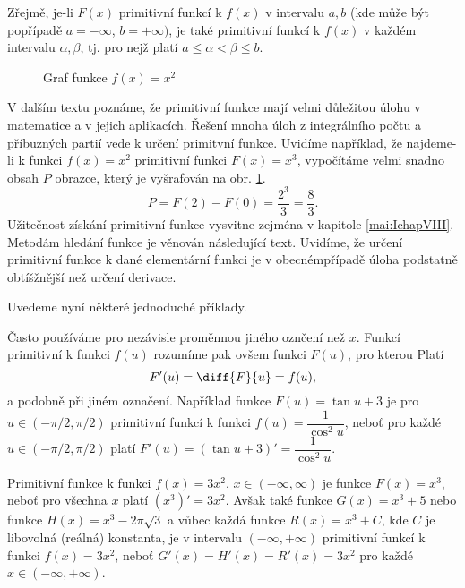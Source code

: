      Zřejmě, je-li \(F(x)\) primitivní funkcí k \(f(x)\) v intervalu \(a,b\) (kde může být
      popřípadě \(a=-\infty\), \(b=+\infty)\), je také primitivní funkcí k \(f(x)\) v každém
      intervalu \(\alpha, \beta\), tj. pro nejž platí \(a\leq\alpha<\beta\leq b\). 

      \begin{figure}[ht!]
        \centering
        \caption{Graf funkce \(f(x) = x^2\)}
        \label{mai:fig022}
      \end{figure}
      V dalším textu poznáme, že primitivní funkce mají velmi důležitou úlohu v matematice a v
      jejich aplikacích. Řešení mnoha úloh z integrálního počtu a příbuzných partií vede k určení
      primitvní funkce. Uvidíme například, že najdeme-li k funkci \(f(x)= x^2\) primitivní funkci
      \(F(x) = x^3\), vypočítáme velmi snadno obsah \(P\) obrazce, který je vyšrafován na obr.
      \ref{mai:fig022}.
      \begin{equation*}
        P = F(2) - F(0) = \frac{2^3}{3} = \frac{8}{3}.
      \end{equation*}
      Užitečnost získání primitivní funkce vysvitne zejména v kapitole \ref{mai:IchapVIII}. Metodám
      hledání funkce je věnován následující text. Uvidíme, že určení primitivní funkce k dané
      elementární funkci je v obecnémpřípadě úloha podstatně obtíšžnější než určení derivace.  
 
      Uvedeme nyní některé jednoduché příklady.

      Často používáme pro nezávisle proměnnou jiného oznčení než \(x\). Funkcí primitivní k funkci
      \(f(u)\) rozumíme pak ovšem funkci \(F(u)\), pro kterou Platí
      \begin{equation*}
        F'(u) = \diff{F}{u} = f(u),
      \end{equation*}
      a podobně při jiném označení. Například funkce \(F(u) = \tan u + 3\) je pro \(u\in(-\pi/2,
      \pi/2)\) primitivní funkcí k funkci \(f(u)=\dfrac{1}{\cos^2u}\), neboť pro každé \(u\in(-\pi/2,
      \pi/2)\) platí \(F'(u)=(\tan u + 3)' = \dfrac{1}{\cos^2u}\).

      Primitivní funkce k funkci \(f(x)=3x^2\), \(x\in(-\infty, \infty)\) je funkce \(F(x)=x^3\),
      neboť pro všechna \(x\) platí \((x^3)'=3x^2\). Avšak také funkce \(G(x) = x^3+5\) nebo funkce
      \(H(x)=x^3-2\pi\sqrt{3}\) a vůbec každá funkce \(R(x)=x^3+C\), kde \(C\) je libovolná (reálná)
      konstanta, je v intervalu \((-\infty, +\infty)\) primitivní funkcí k funkci \(f(x)=3x^2\),
      neboť \(G'(x)=H'(x)=R'(x)=3x^2\) pro každé \(x\in(-\infty, +\infty)\). 


